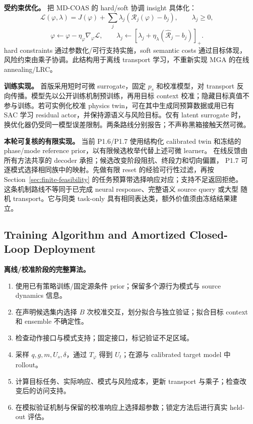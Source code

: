 \documentclass[11pt]{article}
\begin{document}
\textbf{受约束优化。} 把 MD-COAS 的 hard/soft 协调 insight 具体化：
\begin{equation}
 \mathcal L(\varphi,\lambda)
 =J(\varphi)+\sum_j\lambda_j(\mathcal R_j(\varphi)-b_j),
 \qquad\lambda_j\ge0,
\end{equation}
\begin{equation}
 \varphi\leftarrow\varphi-\eta_\varphi\nabla_\varphi\mathcal L,
 \qquad
 \lambda_j\leftarrow[\lambda_j+\eta_\lambda(\widehat{\mathcal R}_j-b_j)]_+.
 \label{eq:lagrange}
\end{equation}
hard constraints 通过参数化/可行支持实施，soft semantic costs 通过目标体现，风险约束由乘子协调。此结构用于离线 transport 学习，不重新实现 MGA 的在线 annealing/LRC。

\textbf{训练实现。} 首版采用短时可微 surrogate，固定 $p_s$ 和校准模型，对 transport 反向传播。模型先以公开训练机制预训练，再用目标 context 校准；隐藏目标真值不参与训练。若可实例化校准 physics twin，可在其中生成同预算数据或用已有 SAC 学习 residual actor，并保持源语义与风险目标。仅有 latent surrogate 时，换优化器仍受同一模型误差限制。两条路线分别报告；不声称黑箱接触天然可微。

\textbf{本轮可复核的有限实现。} 当前 P1.6/P1.7 使用结构化 calibrated twin
和冻结的 phase/mode reference prior，以有限候选枚举代替上述可微 learner。
在线反馈由所有方法共享的 decoder 承担；候选改变阶段阻抗、终段力和切向偏置，
P1.7 可逐模式选择相同族中的映射。先做有限 reset 的经验可行性过滤，再按
Section~\ref{sec:finite-feasibility} 的任务预算带选择响应对应；支持不足返回拒绝。
这条机制路线不等同于已完成 neural response、完整语义 source query 或大型
随机 transport。它与同类 task-only 具有相同表达类，额外价值须由冻结结果建立。

\subsection{Training Algorithm and Amortized Closed-Loop Deployment}
\label{sec:deployment}
\textbf{离线/校准阶段的完整算法。}
\begin{enumerate}
\item 使用已有策略训练/固定源条件 prior；保留多个源行为模式与 source dynamics 信息。
\item 在声明候选集内选择 $B$ 次校准交互，划分拟合与独立验证；拟合目标 context 和 ensemble 不确定性。
\item 检查动作接口与模式支持；固定接口，标记验证不足区域。
\item 采样 $q,g,m,U_s,\delta$，通过 $T_\varphi$ 得到 $U_t$；在源与 calibrated target model 中 rollout。
\item 计算目标任务、实际响应、模式与风险成本，更新 transport 与乘子；检查改变后的访问支持。
\item 在模拟验证机制与保留的校准响应上选择超参数；锁定方法后进行真实 held-out 评估。
\end{enumerate}
\end{document}
